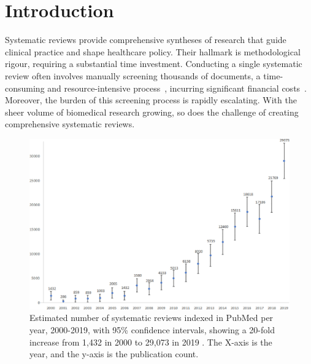 \documentclass[10pt,oneside]{book}
\begin{document}
\newpage
\begingroup %
\small %
\vspace*{-3cm}
\tableofcontents

\endgroup
\newpage
\newcommand{\lightshadowbox}[1]{%
  \setlength{\fboxsep}{6pt}%
  \setlength{\shadowsize}{1pt}%
  \shadowbox{#1}%
}
\begin{multicols}{2}
\printglossary[type=\acronymtype]
\end{multicols}
\newpage




\chapter{Introduction}

Systematic reviews provide comprehensive syntheses of research that guide clinical practice and shape healthcare policy.  Their hallmark is methodological rigour, requiring a substantial time investment. Conducting a single systematic review often involves manually screening thousands of documents, a time-consuming and resource-intensive process~\cite{nussbaumer-streit_resource_2021}, incurring significant financial costs~\cite{michelson_significant_2019}. Moreover, the burden of this screening process is rapidly escalating. With the sheer volume of biomedical research growing, so does the challenge of creating comprehensive systematic reviews.

\begin{figure}
    \centering
    \includegraphics[width=0.5\linewidth]{Confirmation Review/images/sr_per_day.jpg}
    \caption{Estimated number of systematic reviews indexed in PubMed per year, 2000-2019, with 95\% confidence intervals, showing a 20-fold increase from 1,432 in 2000 to 29,073 in 2019 \cite{hoffmann_nearly_2021}. The X-axis is the year, and the y-axis is the publication count.\protect\footnotemark}
    \label{fig:increasing_sr_over_time}
\end{figure}
\end{document}
